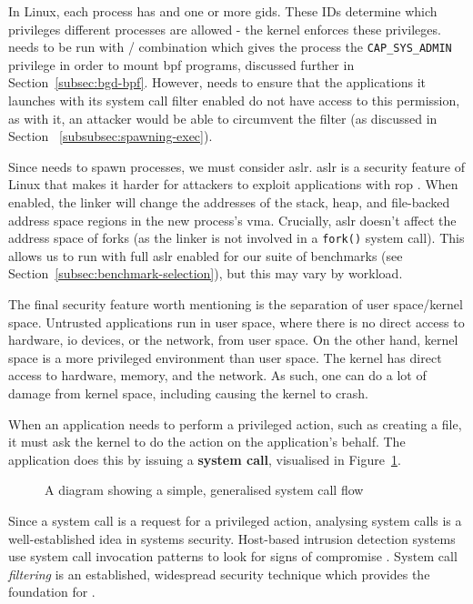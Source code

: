 In Linux, each process has  and one or more \acp{gid}.
These IDs determine which privileges different processes are allowed - the kernel enforces these
privileges. \af needs to be run with
/ combination which gives the process the
\texttt{CAP\_SYS\_ADMIN} privilege in order to mount \ac{bpf} programs,
discussed further in Section~\ref{subsec:bgd-bpf}. However, \af needs to ensure
that the applications it launches with its system call filter enabled do not
have access to this permission, as with it, an attacker would be able to
circumvent the filter (as discussed in Section ~\ref{subsubsec:spawning-exec}).

Since \af needs to spawn processes, we must consider \ac{aslr}. \ac{aslr} is a security feature of Linux that makes it harder for
attackers to exploit applications with \ac{rop} \cite{ASLR_GUARD}. When
enabled, the linker will change the addresses of the stack, heap, and file-backed address space regions in the new process's \ac{vma}. Crucially, \ac{aslr}
doesn't affect the address space of forks (as the linker is not involved in
a \texttt{fork()} system call). This allows us to run \af with full \ac{aslr}
enabled for our suite of benchmarks (see 
Section~\ref{subsec:benchmark-selection}), but this may vary by workload.  

The final security feature worth mentioning is the separation of user
space/kernel space. Untrusted applications run in user space, where there is no
direct access to hardware, \ac{io} devices, or the 
network, from user space. On the other hand, kernel space is a more privileged 
environment than user space. The kernel has direct access to hardware, memory, and the
network. As such, one can do a lot of damage from kernel space, including causing
the kernel to crash.

When an application needs to perform a privileged action, such as creating a
file, it must ask the kernel to do the action on the application's behalf. The
application does this by issuing a \textbf{system call}, visualised in
Figure~\ref{fig:syscall-flow}.

\begin{figure}[h]
\centering
{}
\caption{A diagram showing a simple, generalised system call
flow}\label{fig:syscall-flow}
\end{figure}

Since a system call is a request for a privileged action, analysing system calls
is a well-established idea in systems security. Host-based intrusion detection
systems use system call invocation patterns to look for signs of compromise 
\cite{10.1145/3214304}. System call \textit{filtering} is an established, 
widespread security technique which provides the foundation for \af.

